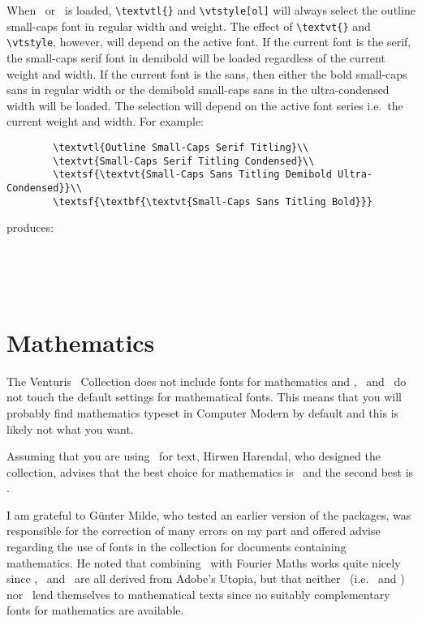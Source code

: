 \documentclass[11pt,british]{article}
\begin{document}
	When \ or \ is loaded, \verb|\textvtl{}| and \verb|\vtstyle[ol]| will always select the outline small-caps font in regular width and weight. The effect of \verb|\textvt{}| and \verb|\vtstyle|, however, will depend on the active font. If the current font is the serif, the small-caps serif font in demibold will be loaded regardless of the current weight and width. If the current font is the sans, then either the bold small-caps sans in regular width or the demibold small-caps sans in the ultra-condensed width will be loaded. The selection will depend on the active font series i.e.\ the current weight and width. For example:
	\begin{verbatim}
		\textvtl{Outline Small-Caps Serif Titling}\\
		\textvt{Small-Caps Serif Titling Condensed}\\
		\textsf{\textvt{Small-Caps Sans Titling Demibold Ultra-Condensed}}\\
		\textsf{\textbf{\textvt{Small-Caps Sans Titling Bold}}}
	\end{verbatim}
	produces:
	\begin{center}
		\\
		\\
		\textsf{}\\
		\textsf{\textbf{}}
	\end{center}
	
\section{Mathematics}

The Venturis \adf\ Collection does not include fonts for mathematics and , \ and \ do not touch the default settings for mathematical fonts. This means that you will probably find mathematics typeset in Computer Modern by default and this is likely not what you want.

Assuming that you are using \ for text, Hirwen Harendal, who designed the collection, advises that the best choice for mathematics is \ and the second best is .

I am grateful to G\"unter Milde, who tested an earlier version of the packages, was responsible for the correction of many errors on my part and offered advise regarding the use of fonts in the collection for documents containing mathematics. He noted that combining \ with Fourier Maths works quite nicely since , \ and \ are all derived from Adobe's Utopia, but that neither \ (i.e.~ and ) nor \ lend themselves to mathematical texts since no suitably complementary fonts for mathematics are available.
\end{document}
